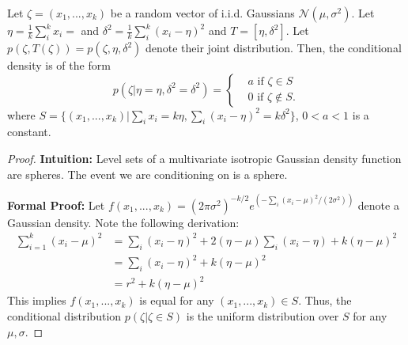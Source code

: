 \begin{theorem} Let  $\zeta=(x_1, ..., x_k)$  be a random vector of i.i.d. Gaussians $\mathcal{N}(\mu, \sigma^2)$. Let $\eta=\frac{1}{k}\sum_i^k x_i = $ and $\delta^2 = \frac{1}{k}\sum_i^k (x_i - \eta)^2$ and $T  = [\eta, \delta^2]$. Let $p(\zeta, T(\zeta)) = p(\zeta, \eta,\delta^2)$ denote their joint distribution.
Then, the conditional density is of the form
    \begin{equation}
        p(\zeta | \eta=\eta,\delta^2 = \delta^2 ) = \begin{cases}
 & a \text{ if } \zeta \in S \\
 & 0 \text{ if } \zeta \notin S.
\end{cases}
\end{equation}
where $S = \{(x_1, ..., x_k) | \sum_i x_i = k\eta, \sum_i(x_i - \eta)^2 = k \delta^2\}$,  $0 < a < 1$ is a constant.
\begin{proof}
\noindent\newline\textbf{Intuition:} Level sets of a multivariate isotropic Gaussian density function are spheres. The event we are conditioning on is a sphere.

\noindent\newline\textbf{Formal Proof:}    Let $f(x_1, ...,x_k) = (2\pi\sigma^2)^{-k/2} e^{(-\sum_i(x_i - \mu)^2 / (2\sigma^2))}$ denote a Gaussian density. Note the following derivation:
    \begin{align*}
        \sum_{i=1}^k(x_i - \mu)^2 &= \sum_i(x_i - \eta)^2 + 2(\eta - \mu)\sum_i(x_i - \eta) + k(\eta - \mu)^2\\
                            &= \sum_i(x_i - \eta)^2 + k(\eta - \mu)^2\\
                            &= r^2 + k(\eta - \mu)^2\label{eqn:constant}
    \end{align*}
 This implies $f(x_1, ..., x_k)$ is equal for any $(x_1, ..., x_k) \in S$. Thus, the conditional distribution $p(\zeta | \zeta \in S)$ is the uniform distribution over $S$ for any $\mu, \sigma$.
\end{proof}
\label{conditional:1}
\end{theorem}

